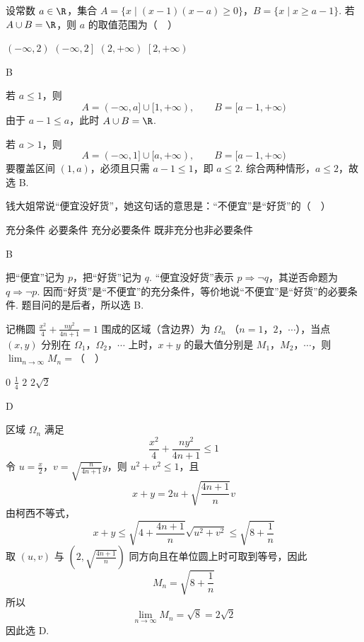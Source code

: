 \begin{problem}
设常数 \(a \in \R\)，集合 \(A = \{x \mid \left(x - 1\right)\left(x - a\right) \geqslant 0\}\)，\(B = \{x \mid x \geqslant a - 1\}\). 若 \(A \cup B = \R\)，则 \(a\) 的取值范围为（\(\quad\)）

\choices
    {\(\left(-\infty, 2\right)\)}
    {\(\left(-\infty, 2\right]\)}
    {\(\left(2, +\infty\right)\)}
    {\(\left[2, +\infty\right)\)}
\begin{answer}
B
\end{answer}

\begin{solution}
若 \(a\leqslant1\)，则
\[
A=(-\infty,a]\cup[1,+\infty),\qquad B=[a-1,+\infty)
\]
由于 \(a-1\leqslant a\)，此时 \(A\cup B=\R\).

若 \(a>1\)，则
\[
A=(-\infty,1]\cup[a,+\infty),\qquad B=[a-1,+\infty)
\]
要覆盖区间 \((1,a)\)，必须且只需 \(a-1\leqslant1\)，即 \(a\leqslant2\). 综合两种情形，\(a\leqslant2\)，故选 B.
\end{solution}
\end{problem}

\begin{problem}
钱大姐常说“便宜没好货”，她这句话的意思是：“不便宜”是“好货”的（\(\quad\)）

\choices
    {充分条件}
    {必要条件}
    {充分必要条件}
    {既非充分也非必要条件}
\begin{answer}
B
\end{answer}

\begin{solution}
把“便宜”记为 \(p\)，把“好货”记为 \(q\). “便宜没好货”表示 \(p\Rightarrow\lnot q\)，其逆否命题为 \(q\Rightarrow\lnot p\). 因而“好货”是“不便宜”的充分条件，等价地说“不便宜”是“好货”的必要条件. 题目问的是后者，所以选 B.
\end{solution}
\end{problem}

\begin{problem}
记椭圆 \(\frac{x^2}{4} + \frac{ny^2}{4n + 1} = 1\) 围成的区域（含边界）为 \(\Omega_n\) （\(n = 1\)，\(2\)，\(\cdots\)），当点 \(\left(x, y\right)\) 分别在 \(\Omega_1\)，\(\Omega_2\)，\(\cdots\) 上时，\(x + y\) 的最大值分别是 \(M_1\)，\(M_2\)，\(\cdots\)，则 \(\displaystyle\lim_{n \to \infty} M_n =\)（\(\quad\)）

\choices
    {\(0\)}
    {\(\frac{1}{4}\)}
    {\(2\)}
    {\(2\sqrt{2}\)}
\begin{answer}
D
\end{answer}

\begin{solution}
区域 \(\Omega_n\) 满足
\[
\frac{x^2}{4}+\frac{ny^2}{4n+1}\leqslant1
\]
令 \(u=\frac{x}{2}\)，\(v=\sqrt{\frac{n}{4n+1}}y\)，则 \(u^2+v^2\leqslant1\)，且
\[
x+y=2u+\sqrt{\frac{4n+1}{n}}v
\]
由柯西不等式，
\[
x+y\leqslant\sqrt{4+\frac{4n+1}{n}}\sqrt{u^2+v^2}
\leqslant\sqrt{8+\frac1n}
\]
取 \((u,v)\) 与 \(\left(2,\sqrt{\frac{4n+1}{n}}\right)\) 同方向且在单位圆上时可取到等号，因此
\[
M_n=\sqrt{8+\frac1n}
\]
所以
\[
\lim_{n\to\infty}M_n=\sqrt8=2\sqrt2
\]
因此选 D.
\end{solution}
\end{problem}

